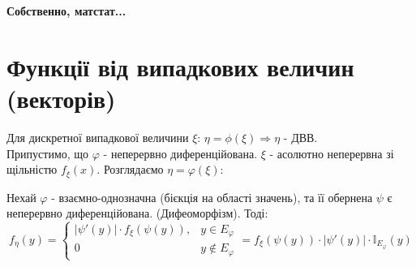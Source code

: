 

\begin{center}
	\Huge \textbf{Собственно, матстат...}
\end{center}
\section{Функції від випадкових величин (векторів)}
Для дискретної випадкової величини $\xi$: $\eta = \phi (\xi) \Rightarrow \eta$ - ДВВ. \\
Припустимо, що $\varphi$ - неперервно диференційована. $\xi$ - асолютно неперервна зі щільністю $f_{\xi}(x)$. Розглядаємо $ \eta = \varphi(\xi) $:

\begin{boxteo}
    Нехай $\varphi$ - взаємно-однозначна (бієкція на області значень), та її обернена $\psi$ є неперервно диференційована. (Дифеоморфізм). Тоді:
    $$
    f_{\eta} (y) = \begin{cases}
    \left| \psi '(y) \right| \cdot  f_{\xi }(\psi (y)), & y \in E_{\varphi}\\
        0 & y \notin E_{\varphi}
    \end{cases} = f_{\xi} (\psi (y)) \cdot \left| \psi'(y) \right| \cdot \mathbb{I}_{E_{\varphi}}(y)
    $$
\end{boxteo}

